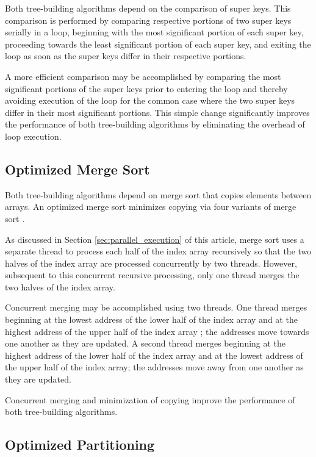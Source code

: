\documentclass{sig-alternate}
\begin{document}
Both tree-building algorithms depend on the comparison of super keys. This comparison is performed by comparing respective portions of two super keys serially in a loop, beginning with the most significant portion of each super key, proceeding towards the least significant portion of each super key, and exiting the loop as soon as the super keys differ in their respective portions. 

A more efficient comparison may be accomplished by comparing the most significant portions of the super keys prior to entering the loop and thereby avoiding execution of the loop for the common case where the two super keys differ in their most significant portions. This simple change significantly improves the performance of both tree-building algorithms by eliminating the overhead of loop execution.

\subsection{Optimized Merge Sort}

Both tree-building algorithms depend on merge sort \cite{Sedgewick} that copies elements between arrays.  An optimized merge sort minimizes copying via four variants of merge sort \cite{Sedgewick2}.

As discussed in Section \ref{sec:parallel_execution} of this article, merge sort uses a separate thread to process each half of the index array recursively so that the two halves of the index array are processed concurrently by two threads.  However, subsequent to this concurrent recursive processing, only one thread merges the two halves of the index array. 

Concurrent merging may be accomplished using two threads.  One thread merges beginning at the lowest address of the lower half of the index array and at the highest address of the upper half of the index array \cite{Sedgewick}; the addresses move towards one another as they are updated. A second thread merges beginning at the highest address of the lower half of the index array and at the lowest address of the upper half of the index array; the addresses move away from one another as they are updated.

Concurrent merging and minimization of copying improve the performance of both tree-building algorithms.

\newpage
\subsection{Optimized Partitioning}
\end{document}
